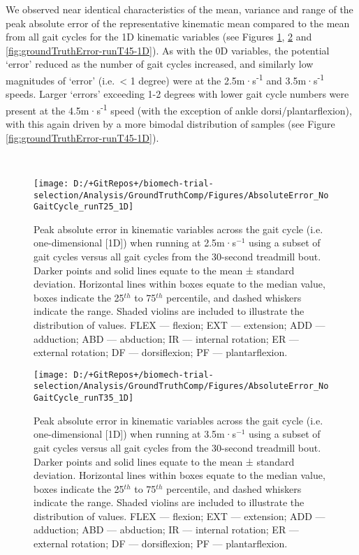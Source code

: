 \documentclass[]{elsarticle} %
\begin{document}
We observed near identical characteristics of the mean, variance and
range of the peak absolute error of the representative kinematic mean
compared to the mean from all gait cycles for the 1D kinematic variables
(see Figures \ref{fig:groundTruthError-runT25-1D},
\ref{fig:groundTruthError-runT35-1D} and
\ref{fig:groundTruthError-runT45-1D}). As with the 0D variables, the
potential `error' reduced as the number of gait cycles increased, and
similarly low magnitudes of `error' (i.e.~\textless{} 1 degree) were at
the 2.5m·s\textsuperscript{-1} and 3.5m·s\textsuperscript{-1} speeds.
Larger `errors' exceeding 1-2 degrees with lower gait cycle numbers were
present at the 4.5m·s\textsuperscript{-1} speed (with the exception of
ankle dorsi/plantarflexion), with this again driven by a more bimodal
distribution of samples (see Figure
\ref{fig:groundTruthError-runT45-1D}).

~

\begin{figure}

{\centering \texttt{[image: D:/+GitRepos+/biomech-trial-selection/Analysis/GroundTruthComp/Figures/AbsoluteError\_NoGaitCycle\_runT25\_1D]} 

}

\caption{Peak absolute error in kinematic variables across the gait cycle (i.e. one-dimensional [1D]) when running at 2.5m·s$^{-1}$ using a subset of gait cycles versus all gait cycles from the 30-second treadmill bout. Darker points and solid lines equate to the mean ± standard deviation. Horizontal lines within boxes equate to the median value, boxes indicate the 25$^{th}$ to 75$^{th}$ percentile, and dashed whiskers indicate the range. Shaded violins are included to illustrate the distribution of values. FLEX — flexion; EXT — extension; ADD — adduction; ABD — abduction; IR — internal rotation; ER — external rotation; DF — dorsiflexion; PF — plantarflexion.}\label{fig:groundTruthError-runT25-1D}
\end{figure}

\begin{figure}

{\centering \texttt{[image: D:/+GitRepos+/biomech-trial-selection/Analysis/GroundTruthComp/Figures/AbsoluteError\_NoGaitCycle\_runT35\_1D]} 

}

\caption{Peak absolute error in kinematic variables across the gait cycle (i.e. one-dimensional [1D]) when running at 3.5m·s$^{-1}$ using a subset of gait cycles versus all gait cycles from the 30-second treadmill bout. Darker points and solid lines equate to the mean ± standard deviation. Horizontal lines within boxes equate to the median value, boxes indicate the 25$^{th}$ to 75$^{th}$ percentile, and dashed whiskers indicate the range. Shaded violins are included to illustrate the distribution of values. FLEX — flexion; EXT — extension; ADD — adduction; ABD — abduction; IR — internal rotation; ER — external rotation; DF — dorsiflexion; PF — plantarflexion.}\label{fig:groundTruthError-runT35-1D}
\end{figure}
\end{document}

